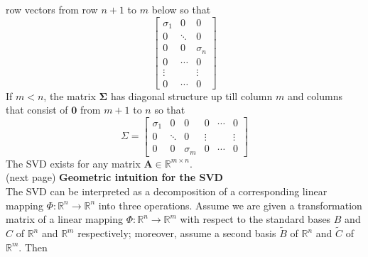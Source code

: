 \documentclass{report}
\begin{document}
row vectors from row $n+1$ to $m$ below so that
\begin{equation*}
\begin{bmatrix}
\sigma_1&0&0\\0&\ddots&0\\0&0&\sigma_n\\
0&\cdots&0\\\vdots&&\vdots\\0&\cdots&0
\end{bmatrix}
\end{equation*}
If $m<n$, the matrix $\bm{\Sigma}$ has diagonal structure up till column $m$ and columns that consist of 
$\bm{0}$ from $m+1$ to $n$ so that
\begin{equation*}
\Sigma=\begin{bmatrix}
\sigma_1&0&0&0&\cdots&0\\0&\ddots&0&\vdots&&\vdots\\
0&0&\sigma_m&0&\cdots&0
\end{bmatrix}
\end{equation*}
The SVD exists for any matrix $\bm{A}\in\mathbb{R}^{m\times n}$.\\
(next page)
\newpage
\noindent\textbf{Geometric intuition for the SVD}\\
The SVD can be interpreted as a decomposition of a corresponding linear mapping $\Phi:\mathbb{R}^n\to\mathbb{R}^n$ 
into three operations. Assume we are given a transformation matrix of a linear mapping 
$\Phi:\mathbb{R}^n\to\mathbb{R}^m$ with respect to the standard bases $B$ and $C$ of $\mathbb{R}^n$ and 
$\mathbb{R}^m$ respectively; moreover, assume a second basis $\tilde{B}$ of $\mathbb{R}^n$ and $\tilde{C}$ of 
$\mathbb{R}^m$. Then
\end{document}
